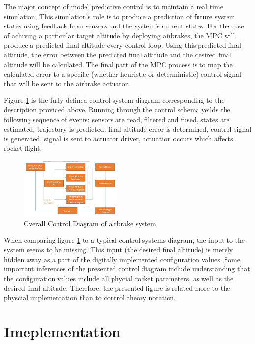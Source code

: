 \documentclass[conference, letterpaper]{IEEEtran}
\begin{document}
The major concept of model predictive control is to maintain a real time
simulation; This simulation's role is to produce a prediction of future system
states using feedback from sensors and the system's current states. For the case
of achiving a particular target altitude by deploying airbrakes, the MPC will
produce a predicted final altitude
every control loop. Using this predicted final altitude, the error between the
predicted final altitude and the desired final altitude will be calculated. The
final part of the MPC process is to map the calculated error to a specific
(whether heuristic or deterministic) control signal that will be sent to the
airbrake actuator.

Figure \ref{fig:MPC_diagram} is the fully defined control system diagram
corresponding to the description provided above. Running through the control
schema yeilds the following sequence of events: sensors are read, filtered and
fused, states are estimated, trajectory is predicted, final altitude error is
determined, control signal is generated, signal is sent to actuator driver,
actuation occurs which affects rocket flight.

\begin{figure}[H]
\centering
\includegraphics[width=0.45\textwidth]{./MPC_diagram}
\caption{Overall Control Diagram of airbrake system}
\label{fig:MPC_diagram}
\end{figure}

When comparing figure \ref{fig:MPC_diagram} to a
typical control systems diagram, the input to the system seems to be missing;
This input (the desired final altitude) is merely hidden away as a part of the
digitally implemented configuration values. Some important inferences of the
presented control diagram include understanding that the configuration values
include all phycial rocket parameters, as well as the desired final altitude.
Therefore, the presented figure is related more to the physcial implementation
than to control theory notation.

\section{Imeplementation}
\end{document}
